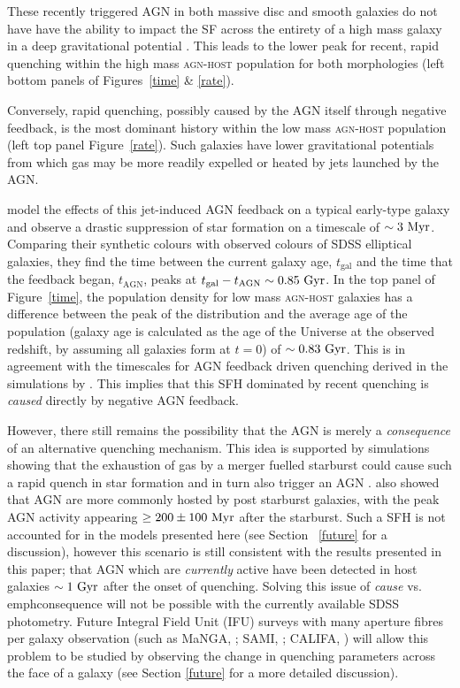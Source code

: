 These recently triggered AGN in both massive disc and smooth galaxies do not have have the ability to impact the SF across the entirety of a high mass galaxy in a deep gravitational potential \citep{ishibashi12, Zinn13}. This leads to the lower peak for recent, rapid quenching within the high mass \textsc{agn-host} population for both morphologies (left bottom panels of Figures~\ref{time} \& \ref{rate}). 

Conversely, rapid quenching, possibly caused by the AGN itself through negative feedback, is the most dominant history within the low mass \textsc{agn-host} population (left top panel Figure~\ref{rate}). Such galaxies have lower gravitational potentials from which gas may be more readily expelled or heated \citep{tortora09} by jets launched by the AGN. 

\cite{tortora09} model the effects of this jet-induced AGN feedback on a typical early-type galaxy and observe a drastic suppression of star formation on a timescale of $\sim 3 ~\rm{Myr}$. Comparing their synthetic colours with observed colours of SDSS elliptical galaxies, they find the time between the current galaxy age, $t_\mathrm{gal}$ and the time that the feedback began, $t_\mathrm{AGN}$, peaks at $t_\mathrm{gal} - t_\mathrm{AGN} \sim 0.85 ~\rm{Gyr}$. In the top panel of Figure~\ref{time}, the population density for low mass \textsc{agn-host} galaxies has a difference between the peak of the distribution and the average age of the population (galaxy age is calculated as the age of the Universe at the observed redshift, by assuming all galaxies form at $t=0$) of $\sim0.83 ~\rm{Gyr}$. This is in agreement with the timescales for AGN feedback driven quenching derived in the simulations by \citet{tortora09}. This implies that this SFH dominated by recent quenching is \emph{caused} directly by negative AGN feedback.

However, there still remains the possibility that the AGN is merely a \emph{consequence} of an alternative quenching mechanism. This idea is supported by simulations showing that the exhaustion of gas by a merger fuelled starburst could cause such a rapid quench in star formation and in turn also trigger an AGN \citep{Croton06, Wild09, Snyder11, Hayward14}. \citet{Yesuf14} also showed that AGN are more commonly hosted by post starburst galaxies, with the peak AGN activity appearing $\geq 200 \pm 100 ~\rm{Myr}$ after the starburst. Such a SFH is not accounted for in the models presented here (see Section ~\ref{future} for a discussion), however this scenario is still consistent with the results presented in this paper; that AGN which are \emph{currently} active have been detected in host galaxies $\sim 1~\rm{Gyr}$ after the onset of quenching. Solving this issue of \emph{cause} vs. emph{consequence} will not be possible with the currently available SDSS photometry. Future Integral Field Unit (IFU) surveys with many aperture fibres per galaxy observation (such as MaNGA, \citealt{bundy15}; SAMI, \citealt{croom12}; CALIFA, \citealt{sanchez12}) will allow this problem to be studied by observing the change in quenching parameters across the face of a galaxy (see Section \ref{future} for a more detailed discussion). 
 
